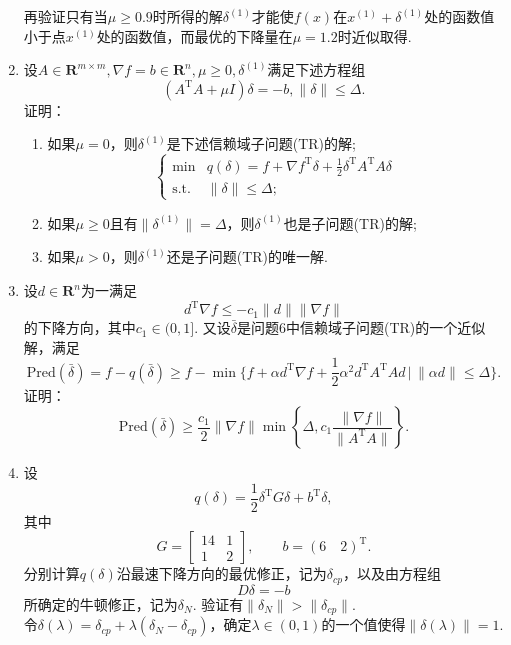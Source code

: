 \begin{enumerate}
    再验证只有当$\mu \geqslant 0.9$时所得的解$\delta^{(1)}$才能使$f(x)$在$x^{(1)}+\delta^{(1)}$处的函数值小于点$x^{(1)}$处的函数值，而最优的下降量在$\mu=1.2$时近似取得.\\
    \omitted
    \item 设$A \in \textbf{R}^{m \times m},\nabla f=b \in \textbf{R}^n,\mu \geqslant 0,\delta^{(1)}$满足下述方程组\[(A^{\mathrm{T}}A+\mu I)\delta=-b,\|\delta\| \leqslant \Delta.\]证明：
    \begin{enumerate}[label=(\arabic*)]
        \item 如果$\mu=0$，则$\delta^{(1)}$是下述信赖域子问题(TR)的解;
        \[\begin{cases}
            \min & \displaystyle q(\delta)=f+\nabla f^{\mathrm{T}}\delta+\frac{1}{2}\delta^{\mathrm{T}} A^{\mathrm{T}} A \delta\\
            \text{s.t.} & \|\delta\| \leqslant \Delta;
        \end{cases}\]
        \item 如果$\mu \geqslant 0$且有$\|\delta^{(1)}\|=\Delta$，则$\delta^{(1)}$也是子问题(TR)的解;
        \item 如果$\mu > 0$，则$\delta^{(1)}$还是子问题(TR)的唯一解.
    \end{enumerate}
    \omitted
    \item 设$d \in \textbf{R}^n$为一满足\[d^{\mathrm{T}} \nabla f \leqslant -c_1 \|d\|\|\nabla f\|\]的下降方向，其中$c_1 \in (0,1]$. 又设$\bar{\delta}$是问题6中信赖域子问题(TR)的一个近似解，满足\[\text{Pred}(\bar{\delta})=f-q(\bar{\delta})\geqslant f-\min\{f+\alpha d^{\mathrm{T}} \nabla f+\frac{1}{2}\alpha^2 d^{\mathrm{T}} A^{\mathrm{T}} A d \, | \, \|\alpha d\| \leqslant \Delta\}.\]证明：
    \[\text{Pred}(\bar{\delta}) \geqslant \frac{c_1}{2}\|\nabla f\| \min\left\{\Delta, c_1\frac{\|\nabla f\|}{\|A^{\mathrm{T}} A\|}\right\}.\]
    \omitted
    \item 设\[q(\delta)=\frac{1}{2}\delta^{\mathrm{T}}G\delta+b^{\mathrm{T}}\delta,\]其中\[G=\begin{bmatrix}
        14 & 1\\1 & 2
    \end{bmatrix},\qquad b=(6 \quad 2)^{\mathrm{T}}.\]
    分别计算$q(\delta)$沿最速下降方向的最优修正，记为$\delta_{cp}$，以及由方程组\[D\delta=-b\]所确定的牛顿修正，记为$\delta_N$. 验证有$\|\delta_N\| > \|\delta_{cp}\|$.\\
    令$\delta(\lambda)=\delta_{cp}+\lambda(\delta_N-\delta_{cp})$，确定$\lambda \in (0,1)$的一个值使得$\|\delta(\lambda)\|=1$.\\

\end{enumerate}

